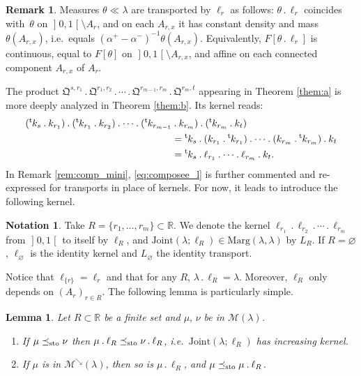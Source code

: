 \documentclass[10pt,a4paper]{article}
\providecommand{\ie}{i.e.\ }
\newcommand{\ldot}{\mathbin{.}}
\newcommand{\lcdots}{\ldot\cdots\ldot}
\theoremstyle{plain}
\newtheorem{lem}[them]{Lemma}
\theoremstyle{definition}
\newtheorem{notation}[them]{Notation} %
\newtheorem{rem}[them]{Remark}
\newcommand{\join}{\mathrm{Joint}}
\newcommand{\como}{\mathfrak{Q}}
\newcommand{\trans}{{}^{\mathrm{t}}\mkern-1mu}
\newcommand{\la}{\lambda}
\newcommand{\m}{\mathcal{M}}
\newcommand{\ma}{\mathrm{Marg}}
\newcommand{\R}{\mathbb{R}}
\newcommand{\leqs}{\preceq_{\text{\rm sto}}}
\newcommand{\mdec}{\mathcal{M}^{\scriptscriptstyle\searrow}}
\newcommand{\op}{\mathopen}
\newcommand{\clo}{\mathclose}
\begin{document}
\begin{rem}\label{rem:action_l}Measures $\theta\ll \la$ are transported by $\ell_r$ as follows: $\theta\ldot \ell_r$ coincides with~$\theta$ on $\op]0,1\clo[\setminus A_r$, and on each $A_{r,x}$ it has constant density and mass $\theta(A_{r,x})$, \ie equals $(\alpha^+-\alpha^-)^{-1}\theta(A_{r,x})$. Equivalently, $F[\theta\ldot \ell_r]$ is continuous, equal to $F[\theta]$ on $\op]0,1\clo[\setminus A_{r,x}$, and affine on each connected component $A_{r,x}$ of $A_r$.
\end{rem}

The product $\como^{s,r_1}{}\ldot\como^{r_1,r_2}\lcdots \como^{r_{m-1},r_m}{}\ldot\como^{r_m,t}$ appearing in Theorem \ref{them:a} is more deeply analyzed in Theorem \ref{them:b}. Its kernel reads:
\begin{equation}\label{eq:composee_l}
\begin{aligned}
(\trans k_s\ldot k_{r_1})\ldot(\trans k_{r_1}{}\ldot k_{r_2})\lcdots (\trans k_{r_{m-1}}&\ldot k_{r_m})\ldot(\trans k_{r_m}{}\ldot k_t)\\
&= \trans k_s\ldot(k_{r_1}{}\ldot\trans k_{r_1})\lcdots (k_{r_m}{}\ldot\trans k_{r_m})\ldot k_t\\
&=\trans k_s\ldot\ell_{r_1}\lcdots \ell_{r_m}{}\ldot k_t.
\end{aligned}
\end{equation}
In Remark \ref{rem:comp_mini}, \eqref{eq:composee_l} is further commented and re-expressed for transports in place of kernels. For now, it leads to introduce the following kernel.

\begin{notation}\label{notation:Ts}
Take $R=\{r_1,\ldots,r_m\}\!\subset\!\R$. We denote the kernel \hbox{$\ell_{r_1}{}\ldot\ell_{r_2}{}\ldot\cdots\ldot\ell_{r_m}$} from $\op]0,1\clo[$ to itself by $\ell_R$, and $\join(\la;\ell_R)\in\ma(\la,\la)$ by $L_R$. If $R=\varnothing$, $\ell_\varnothing$ is the identity kernel and $L_\varnothing$ the identity transport.
\end{notation}

Notice that $\ell_{\{r\}}=\ell_r$ and that for any $R$, $\la\ldot\ell_R=\la$. Moreover, $\ell_R$ only depends on $(A_r)_{r\in R}$. The following lemma is particularly simple.

\begin{lem}\label{lem:mono1}
Let $R\subset \R$ be a finite set and $\mu,\,\nu$ be in $\m(\la)$.

\begin{enumerate}
\item
\label{item:mono1a} If $\mu\leqs \nu$ then $\mu \ldot\ell_R\leqs \nu\ldot\ell_R$, \ie $\join(\la; \ell_R)$ has increasing kernel.
\item
\label{item:mono1b} If $\mu$ is in $\mdec(\la)$, then so is $\mu \ldot\ell_R$, and $\mu\leqs \mu\ldot\ell_R$.
\end{enumerate}
\end{lem}
\end{document}
